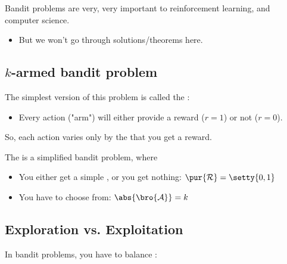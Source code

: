         Bandit problems are very, very important to reinforcement learning, and computer science.

        \begin{itemize}
            \item But we won't go through solutions/theorems here.
        \end{itemize}



    \phantom{}

    \subsection{$k$-armed bandit problem}

        The simplest version of this problem is called the :

        \begin{itemize}
            \item Every action ("arm") will either provide a reward ($r=1$) or not ($r=0$).
        \end{itemize}

        So, each action varies only by the  that you get a reward.
            \\

        \begin{definition}
            The  is a simplified bandit problem, where

            \begin{itemize}
                \item You either get a simple , or you get nothing: $\pur{\mathcal{R}} = \setty{0,1}$

                \item You have  to choose from: $\abs{\bro{\mathcal{A}}}=k$
            \end{itemize}
        \end{definition}



    \phantom{}

    \subsection{Exploration vs. Exploitation}

        In bandit problems, you have to balance :


